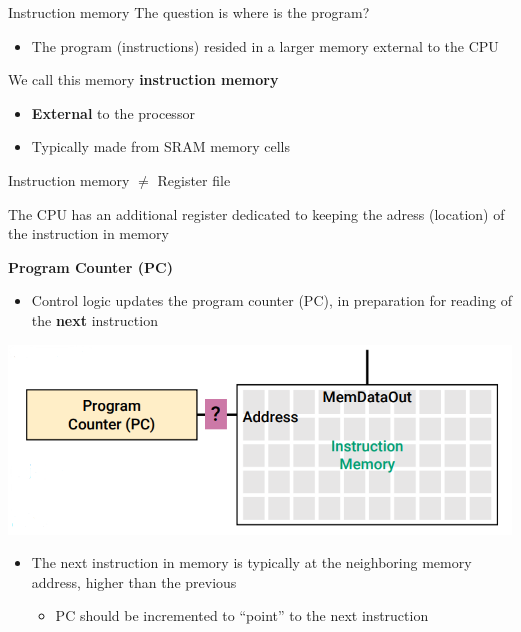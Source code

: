 \begin{parag}{Instruction memory}
    The question is where is the program?
    \begin{itemize}
        \item The program (instructions) resided in a larger memory external to the CPU
    \end{itemize}
    We call this memory \textbf{instruction memory}
    \begin{itemize}
        \item \textbf{External} to the processor
        \item Typically made from SRAM memory cells
    \end{itemize}
    \begin{framedremark}
        \begin{center}
            Instruction memory $\neq$ Register file
        \end{center}
    \end{framedremark}
    The CPU has an additional register dedicated to keeping the adress (location) of the instruction in memory
    \begin{center}
        \textbf{Program Counter (PC)}
    \end{center}
    \begin{itemize}
        \item Control logic updates the program counter (PC), in preparation for reading of the \textbf{next} instruction
    \end{itemize}
    
    
    \begin{center}
        \includegraphics[scale=0.6]{172025-06-20.png}
    \end{center}
    \begin{itemize}
        \item The next instruction in memory is typically at the neighboring memory address, higher than the previous
            \begin{itemize}
                \item PC should be incremented to ``point'' to the next instruction 
            \end{itemize}
    \end{itemize}
    

\end{parag}
